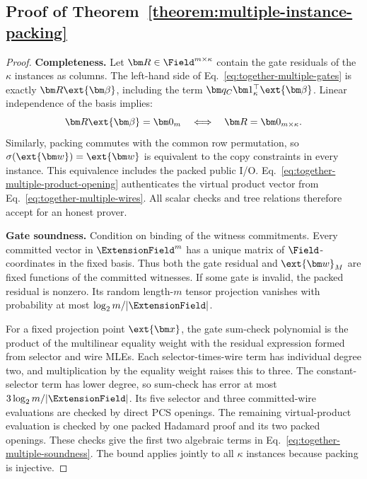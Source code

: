 \subsection{Proof of Theorem~\ref{theorem:multiple-instance-packing}}
\label{appx:proof-multiple-instance}

\begin{proof}
\noindent\textbf{Completeness.}
Let \(\bm R\in\Field^{m\times\kappa}\) contain the gate
residuals of the \(\kappa\) instances as columns.
The left-hand side of Eq.~\eqref{eq:together-multiple-gates}
is exactly \(\bm R\ext{\bm\beta}\), including the term
\(\bm q_C\bm1_\kappa^\top\ext{\bm\beta}\).
Linear independence of the basis implies:
\[
    \bm R\ext{\bm\beta}=\bm0_m
       \quad\Longleftrightarrow\quad
    \bm R=\bm0_{m\times\kappa}.
\]
Similarly, packing commutes with the common row permutation,
so \(\sigma(\ext{\bm w})=\ext{\bm w}\) is equivalent to
the copy constraints in every instance.
This equivalence includes the packed public I/O.
Eq.~\eqref{eq:together-multiple-product-opening} authenticates
the virtual product vector from
Eq.~\eqref{eq:together-multiple-wires}.
All scalar checks and tree relations therefore accept for an
honest prover.

\smallskip\noindent\textbf{Gate soundness.}
Condition on binding of the witness commitments.
Every committed vector in \(\ExtensionField^m\) has a unique
matrix of \(\Field\)-coordinates in the fixed basis.
Thus both the gate residual and \(\ext{\bm w}_M\) are fixed
functions of the committed witnesses.
If some gate is invalid, the packed residual is nonzero.
Its random length-\(m\) tensor projection vanishes with
probability at most \(\log_2m/|\ExtensionField|\).

For a fixed projection point \(\ext{\bm x}\), the gate
sum-check polynomial is the product of the multilinear equality
weight with the residual expression formed from selector and wire
MLEs. Each selector-times-wire term has individual degree two,
and multiplication by the equality weight raises this to three.
The constant-selector term has lower degree, so sum-check has
error at most
\(3\log_2m/|\ExtensionField|\).
Its five selector and three committed-wire evaluations are
checked by direct PCS openings.
The remaining virtual-product evaluation is checked by one
packed Hadamard proof and its two packed openings.
These checks give the first two algebraic terms in
Eq.~\eqref{eq:together-multiple-soundness}. The bound applies
jointly to all \(\kappa\) instances because packing is injective.


\end{proof}

